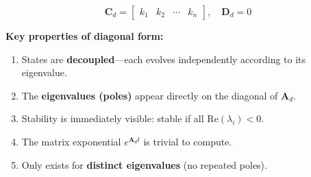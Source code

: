 \begin{equation}
\mathbf{C}_d = \begin{bmatrix} k_1 & k_2 & \cdots & k_n \end{bmatrix}, \quad \mathbf{D}_d = 0
\label{eq:diagonal_CD}
\end{equation}

\textbf{Key properties of diagonal form:}
\begin{enumerate}
    \item States are \textbf{decoupled}---each evolves independently according to its eigenvalue.
    \item The \textbf{eigenvalues (poles)} appear directly on the diagonal of $\mathbf{A}_d$.
    \item Stability is immediately visible: stable if all $\text{Re}(\lambda_i) < 0$.
    \item The matrix exponential $e^{\mathbf{A}_d t}$ is trivial to compute.
    \item Only exists for \textbf{distinct eigenvalues} (no repeated poles).
\end{enumerate}

